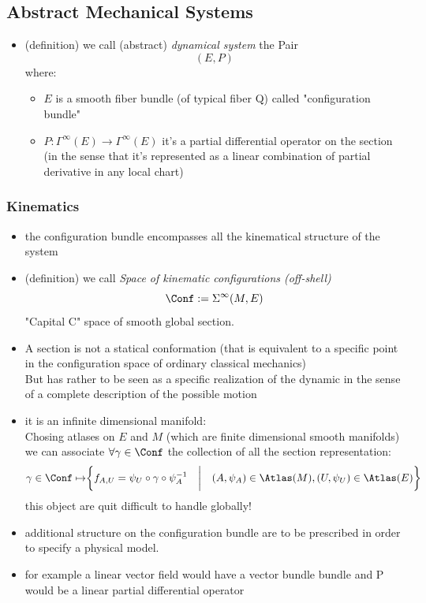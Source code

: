 \documentclass[a4paper,11pt]{scrartcl}
\begin{document}
    \subsection{Abstract Mechanical Systems}
    \begin{itemize}
        \item (definition) we call (abstract) \emph{dynamical system} the Pair $$(E,P)$$ where:
        \begin{itemize}
            \item $E$ is a smooth fiber bundle (of typical fiber Q) called "configuration bundle"
            \item $P: \Gamma^\infty(E) \rightarrow \Gamma^\infty(E)$ it's a partial differential operator on the section\\
            (in the sense that it's represented as a linear combination of partial derivative in any local chart)
        \end{itemize}
    \end{itemize}
    \subsubsection*{Kinematics}
    \begin{itemize}
        \item the configuration bundle encompasses all the kinematical structure of the system
        \item (definition) we call \emph{Space of kinematic configurations (off-shell)}
        $$ \Conf := \Sigma^\infty(M,E)$$
        "Capital C"  space of smooth global section.
        \item A section is not a statical conformation (that is equivalent to a specific point in the configuration space of ordinary classical mechanics) \\
        But has rather to be seen as a specific realization of the dynamic in the sense of a complete description of the possible motion
        \item it is an infinite dimensional manifold:\\
        Chosing atlases on $E$ and $M$ (which are finite dimensional smooth manifolds) we can associate $\forall \gamma \in \Conf$ the collection of all the section representation:
        $$ \gamma \in \Conf \mapsto \biggr\{f_{A,U}=\psi_U \circ \gamma \circ \psi_A^{-1} \quad \biggr\vert \quad (A,\psi_A) \in \Atlas(M), (U,\psi_U)\in \Atlas(E)   \biggr\} $$
        this object are quit difficult to handle globally!
        \item additional structure on the configuration bundle are to be prescribed in order to specify a physical model.
        \item for example a linear vector field would have a vector bundle bundle and P would be a linear partial differential operator
    \end{itemize}
\end{document}
